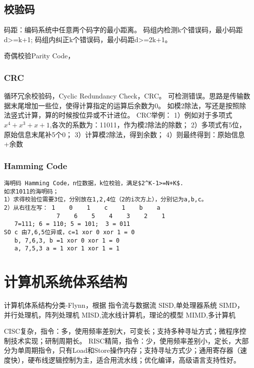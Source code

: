 \documentclass[UTF8]{../computerUniverse}
\begin{document}
\subsection{校验码}


码距：编码系统中任意两个码字的最小距离。
码组内检测k个错误码，最小码距d>=k+1;
码组内纠正k个错误码，最小码距d>=2k+1。


奇偶校验Parity Code，


\subsubsection{CRC}
循环冗余校验码，Cyclic Redundancy Check，CRC。
可检测错误。思路是传输数据末尾增加一些位，使得计算指定的运算后余数为0。
如模2除法，写还是按照除法竖式计算，算的时候按位异或不计进位。
CRC举例：
1）例如对于多项式$x^4+x^3+x+1$,各次的系数为：11011，作为模2除法的除数；
2）多项式有5位，原始信息末尾补5个0；
3）计算模2除法，得到余数；
4）则最终得到：原始信息+余数

\subsubsection{Hamming Code}

\begin{lstlisting}
海明码 Hamming Code，n位数据，k位校验，满足$2^K-1>=N+K$. 
如求1011的海明码；
1）求得校验位需要3位，分别放在1,2,4位（2的i次方上），分别记为a,b,c。
2）从右往左写： 1    0    1    c    1    b    a
               7    6    5    4    3    2    1
   7=111; 6 = 110; 5 = 101;  3 = 011
SO c 由7,6,5位异或，c=1 xor 0 xor 1 = 0
   b, 7,6,3, b =1 xor 0 xor 1 = 0
   a, 7,5,3 a = 1 xor 1 xor 1 = 1
\end{lstlisting}








\section{计算机系统体系结构}





计算机体系结构分类-Flynn，根据 指令流与数据流
SISD,单处理器系统
SIMD，并行处理机，阵列处理机
MISD,流水线计算机，理论的模型
MIMD,多计算机

CISC复杂，指令：多，使用频率差别大，可变长；支持多种寻址方式；微程序控制技术实现；研制周期长。
RISC精简，指令：少，使用频率差别小，定长，大部分为单周期指令，只有Load和Store操作内存；支持寻址方式少；通用寄存器（速度快），硬布线逻辑控制为主，适合用流水线；优化编译，高级语言支持性好。
\end{document}
